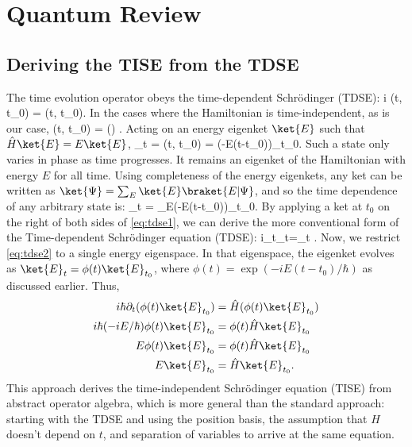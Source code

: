 \section{Quantum Review}
\subsection{Deriving the TISE from the TDSE}
The time evolution operator obeys the time-dependent Schr{\"o}dinger (TDSE):
\be 
	i\hbar \; (t, t_0) = (t, t_0)\label{eq:tdse1}.
\ee
In the cases where the Hamiltonian is time-independent, as is our case, 
\be
	(t, t_0) = \exp\left(\right) \label{eq:timeevol}.
\ee
Acting on an energy eigenket $\ket{E}$ such that $\hat{H}\ket{E} = E\ket{E}$, 
\bea
	_t = (t, t_0) = \exp\left(-E(t-t_0)\right)_{t_0}.
\eea
Such a state only varies in phase as time progresses. It remains an eigenket of the Hamiltonian with energy $E$ for all time. Using completeness of the energy eigenkets, any ket can be written as $\ket{\Psi} = \sum_{E}\ket{E}\braket{E|\Psi}$, and so the time dependence of any arbitrary state is:
\bea
	\ket{\Psi}_t = \sum_E\exp\left(-E(t-t_0)\right)_{t_0}.
\eea
By applying a ket at $t_0$ on the right of both sides of \cref{eq:tdse1}, we can derive the more conventional form of the Time-dependent Schr{\"o}dinger equation (TDSE):
\be
	i\hbar\;\partial_t\ket{\Psi}_t=\ket{\Psi}_t \label{eq:tdse2}.
\ee
Now, we restrict \cref{eq:tdse2} to a single energy eigenspace. In that eigenspace, the eigenket evolves as $\ket{E}_t = \phi(t) \ket{E}_{t_0}$, where $\phi(t) =\exp(-iE(t-t_0)/\hbar)$ as discussed earlier. Thus, 
\begin{align*}
	i\hbar \partial_t(\phi(t)\ket{E}_{t_0}) &= \hat{H}(\phi(t)\ket{E}_{t_0}) \\
	i\hbar(-iE/\hbar)\phi(t)\ket{E}_{t_0} &= \phi(t)\hat{H}\ket{E}_{t_0} \\
	E\phi(t)\ket{E}_{t_0} &= \phi(t) \hat{H}\ket{E}_{t_0} \\
	E\ket{E}_{t_0} &= \hat{H}\ket{E}_{t_0}.
\end{align*}
This approach derives the time-independent Schr{\"o}dinger equation (TISE) from abstract operator algebra, which is more general than the standard approach: starting with the TDSE and using the position basis, the assumption that $H$ doesn't depend on $t$, and separation of variables to arrive at the same equation.




